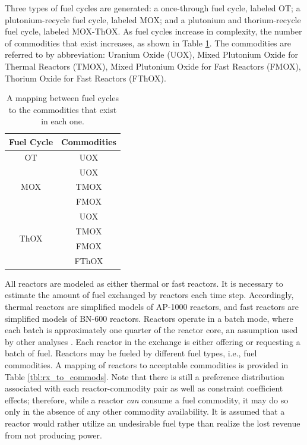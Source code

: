 \documentclass{anstrans}
\begin{document}
Three types of fuel cycles are generated: a once-through fuel cycle, labeled
OT; a plutonium-recycle fuel cycle, labeled MOX; and a plutonium and
thorium-recycle fuel cycle, labeled MOX-ThOX. As fuel cycles increase in
complexity, the number of commodities that exist increases, as shown in Table
\ref{tbl:fc_to_commods}. The commodities are referred to by abbreviation:
Uranium Oxide (UOX), Mixed Plutonium Oxide for Thermal Reactors (TMOX), Mixed
Plutonium Oxide for Fast Reactors (FMOX), Thorium Oxide for Fast Reactors
(FThOX).

\begin{table}[]
\centering
\caption{A mapping between fuel cycles to the commodities that exist in each one.}
\label{tbl:fc_to_commods}
\begin{tabular}{|c|c|}
\hline
\textbf{Fuel Cycle}            & \textbf{Commodities} \\ \hline
OT                    & UOX         \\ \hline
\multirow{3}{*}{MOX}  & UOX         \\  
                      & TMOX        \\  
                      & FMOX        \\ \hline
\multirow{4}{*}{ThOX} & UOX         \\  
                      & TMOX        \\  
                      & FMOX        \\  
                      & FThOX       \\ \hline
\end{tabular}
\end{table}

All reactors are modeled as either thermal or fast reactors. It is necessary to
estimate the amount of fuel exchanged by reactors each time step. Accordingly,
thermal reactors are simplified models of AP-1000 reactors, and fast reactors
are simplified models of BN-600 reactors. Reactors operate in a batch mode,
where each batch is approximately one quarter of the reactor core, an assumption
used by other analyses \cite{rineiski2011reactivity}. Each reactor in the
exchange is either offering or requesting a batch of fuel. Reactors may be
fueled by different fuel types, i.e., fuel commodities. A mapping of reactors to
acceptable commodities is provided in Table \ref{tbl:rx_to_commods}. Note that
there is still a preference distribution associated with each reactor-commodity
pair as well as constraint coefficient effects; therefore, while a reactor
\textit{can} consume a fuel commodity, it may do so only in the absence of any
other commodity availability. It is assumed that a reactor would rather utilize
an undesirable fuel type than realize the lost revenue from not producing power.
\end{document}
